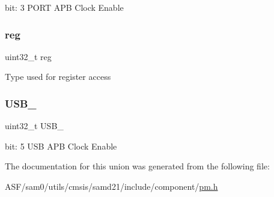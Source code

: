bit\+: 3 P\+O\+RT A\+PB Clock Enable \mbox{\label{union_p_m___a_p_b_b_m_a_s_k___type_a6b91636401516a477989a336376d7b40}} 
\subsubsection{\texorpdfstring{reg}{reg}}
{\footnotesize\ttfamily uint32\+\_\+t reg}

Type used for register access \mbox{\label{union_p_m___a_p_b_b_m_a_s_k___type_ae77ce6f59c35c88ea05ef92a25090acc}} 
\subsubsection{\texorpdfstring{USB\_}{USB\_}}
{\footnotesize\ttfamily uint32\+\_\+t U\+S\+B\+\_\+}

bit\+: 5 U\+SB A\+PB Clock Enable 

The documentation for this union was generated from the following file\+:\begin{DoxyCompactItemize}
\item 
A\+S\+F/sam0/utils/cmsis/samd21/include/component/\mbox{\hyperlink{component_2pm_8h}{pm.\+h}}\end{DoxyCompactItemize}
